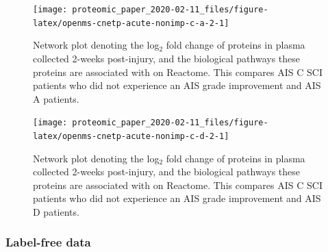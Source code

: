 \documentclass[9pt,lineno]{elife}
\begin{document}
\begin{landscape}



\begin{figure}

{\centering \texttt{[image: proteomic\_paper\_2020-02-11\_files/figure-latex/openms-cnetp-acute-nonimp-c-a-2-1]} 

}

\caption[Network plot - iTRAQ - Acute C Non-Improvers VS Acute A]{Network plot denoting the log\(_2\) fold change of proteins in plasma collected 2-weeks post-injury, and the biological pathways these proteins are associated with on Reactome. This compares AIS C SCI patients who did not experience an AIS grade improvement and AIS A patients.}\label{fig:openms-cnetp-acute-nonimp-c-a-2}
\end{figure}

\end{landscape}
\begin{landscape}



\begin{figure}

{\centering \texttt{[image: proteomic\_paper\_2020-02-11\_files/figure-latex/openms-cnetp-acute-nonimp-c-d-2-1]} 

}

\caption[Network plot - iTRAQ - Acute C Non-Improvers VS Acute D]{Network plot denoting the log\(_2\) fold change of proteins in plasma collected 2-weeks post-injury, and the biological pathways these proteins are associated with on Reactome. This compares AIS C SCI patients who did not experience an AIS grade improvement and AIS D patients.}\label{fig:openms-cnetp-acute-nonimp-c-d-2}
\end{figure}

\end{landscape}
\clearpage

\hypertarget{label-free-data-1}{%
\subsubsection{Label-free data}\label{label-free-data-1}}
\end{document}
